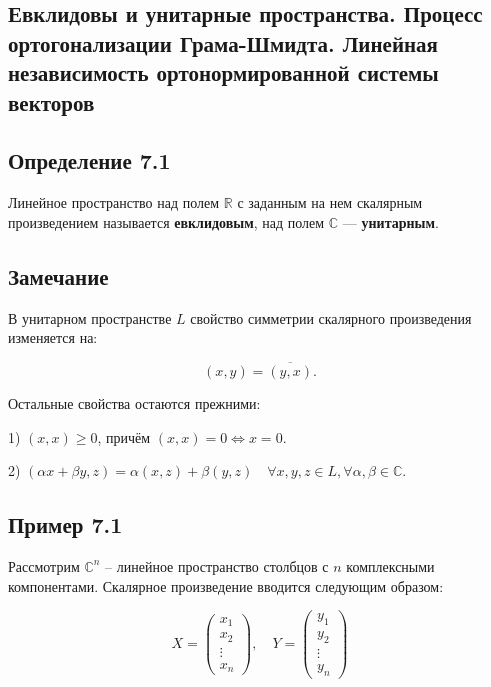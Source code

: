 {
\subsection{Евклидовы и унитарные пространства. Процесс ортогонализации Грама-Шмидта. Линейная независимость ортонормированной системы векторов}
\subsection*{Определение 7.1}

Линейное пространство над полем \( \mathbb{R} \) с заданным на нем скалярным произведением называется \textbf{евклидовым}, над полем \( \mathbb{C} \) — \textbf{унитарным}.

\subsection*{Замечание}

В унитарном пространстве \( L \) свойство симметрии скалярного произведения изменяется на:



\[
(x, y) = \overline{(y, x)}.
\]



Остальные свойства остаются прежними:

1) \( (x, x) \geq 0 \), причём \( (x, x) = 0 \iff x = 0 \).

2) \( (\alpha x + \beta y, z) = \alpha (x, z) + \beta (y, z) \quad \forall x, y, z \in L, \forall \alpha, \beta \in \mathbb{C}. \)

\subsection*{Пример 7.1}

Рассмотрим \( \mathbb{C}^n \) – линейное пространство столбцов с \( n \) комплексными компонентами. Скалярное произведение вводится следующим образом:



\[
X = \begin{pmatrix}
x_1 \\
x_2 \\
\vdots \\
x_n
\end{pmatrix}, \quad Y = \begin{pmatrix}
y_1 \\
y_2 \\
\vdots \\
y_n
\end{pmatrix}
\]



}
